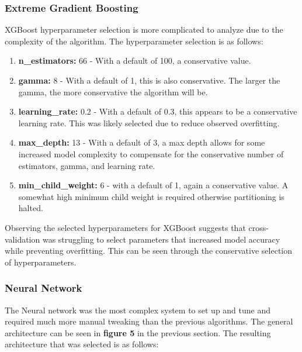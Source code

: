 \documentclass[11pt]{article}
\begin{document}
	\subsubsection{Extreme Gradient Boosting}
	XGBoost hyperparameter selection is more complicated to analyze due to the complexity of the algorithm. The hyperparameter selection is as follows:
	
	\begin{enumerate}
		\item \textbf{n\_estimators:} 66 - With a default of 100, a conservative value.
		\item \textbf{gamma:} 8 - With a default of 1, this is also conservative. The larger the gamma, the more conservative the algorithm will be. 
		\item \textbf{learning\_rate:} 0.2 - With a default of 0.3, this appears to be a conservative learning rate. This was likely selected due to reduce observed overfitting.
		\item \textbf{max\_depth:} 13 - With a default of 3, a max depth allows for some increased model complexity to compensate for the conservative number of estimators, gamma, and learning rate.
		\item \textbf{min\_child\_weight:} 6 - with a default of 1, again a conservative value. A somewhat high minimum child weight is required otherwise partitioning is halted.
	\end{enumerate}
	
	Observing the selected hyperparameters for XGBoost suggests that cross-validation was struggling to select parameters that increased model accuracy while preventing overfitting. This can be seen through the conservative selection of hyperparameters. 
	\subsubsection{Neural Network}
	The Neural network was the most complex system to set up and tune and required much more manual tweaking than the previous algorithms. The general architecture can be seen in \textbf{figure 5} in the previous section. The resulting architecture that was selected is as follows:
	
\end{document}
